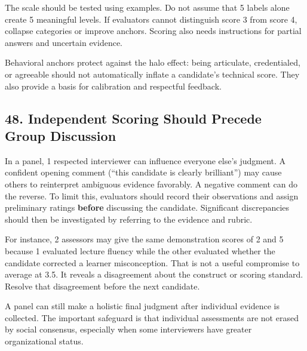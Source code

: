 The scale should be tested using examples. Do not assume that 5 labels alone create 5 meaningful levels. If evaluators cannot distinguish score 3 from score 4, collapse categories or improve anchors. Scoring also needs instructions for partial answers and uncertain evidence.

Behavioral anchors protect against the halo effect: being articulate, credentialed, or agreeable should not automatically inflate a candidate's technical score. They also provide a basis for calibration and respectful feedback.

\subsection*{48. Independent Scoring Should Precede Group Discussion}

In a panel, 1 respected interviewer can influence everyone else's judgment. A confident opening comment (``this candidate is clearly brilliant'') may cause others to reinterpret ambiguous evidence favorably. A negative comment can do the reverse. To limit this, evaluators should record their observations and assign preliminary ratings \textbf{before} discussing the candidate. Significant discrepancies should then be investigated by referring to the evidence and rubric.

For instance, 2 assessors may give the same demonstration scores of 2 and 5 because 1 evaluated lecture fluency while the other evaluated whether the candidate corrected a learner misconception. That is not a useful compromise to average at 3.5. It reveals a disagreement about the construct or scoring standard. Resolve that disagreement before the next candidate.

A panel can still make a holistic final judgment after individual evidence is collected. The important safeguard is that individual assessments are not erased by social consensus, especially when some interviewers have greater organizational status.
